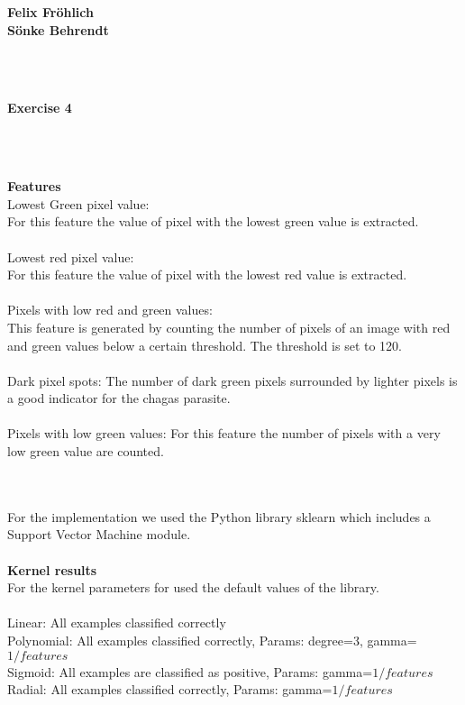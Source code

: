 \documentclass[a4paper]{article}
\begin{document}
\vspace*{-3cm}

\raggedleft
\textbf{Felix Fröhlich} \\
\textbf{Sönke Behrendt}

\centering


~\\~\\
\begin{Large}
\textbf{Exercise 4}
\end{Large}

~\\~\\
\raggedright
\textbf{Features}\\
Lowest Green pixel value:\\
For this feature the value of pixel with the lowest green value is extracted.
~\\ ~\\

Lowest red pixel value:\\
For this feature the value of pixel with the lowest red value is extracted.
~\\ ~\\

Pixels with low red and green values:\\
This feature is generated by counting the number of pixels of an image with red and green values below a certain threshold. The threshold is set to 120.
~\\ ~\\

Dark pixel spots:
The number of dark green pixels surrounded by lighter pixels is a good indicator for the chagas parasite.
~\\ ~\\

Pixels with low green values:
For this feature the number of pixels with a very low green value are counted.

~\\~\\

For the implementation we used the Python library sklearn which includes a Support Vector Machine module.\\
~\\

\textbf{Kernel results} \\
For the kernel parameters for used the default values of the library.\\
~\\
Linear: All examples classified correctly \\
Polynomial: All examples classified correctly, Params: degree=3, gamma=$1/features$ \\
Sigmoid: All examples are classified as positive, Params: gamma=$1/features$ \\
Radial: All examples classified correctly, Params: gamma=$1/features$
\end{document}
